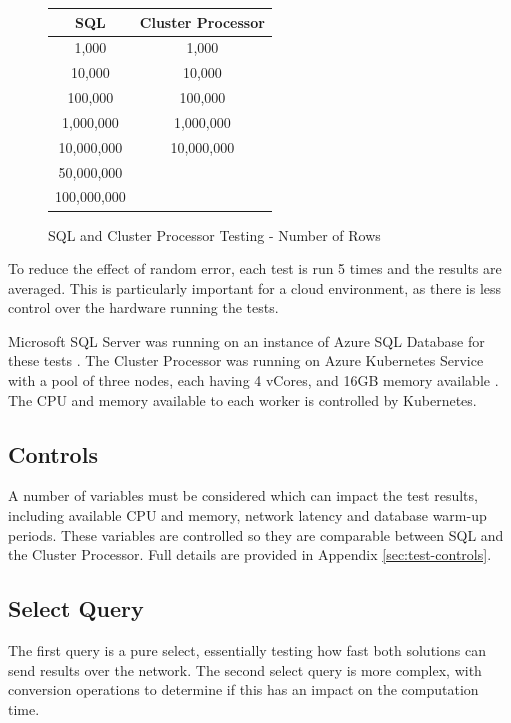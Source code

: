 \begin{figure}[ht]
	\centering
	\begin{tabular}{| c | c |}
		\hline
		\textbf{SQL} & \textbf{Cluster Processor} \\ \hline
		1,000 & 1,000 \\ \hline
		10,000 & 10,000 \\ \hline
		100,000 & 100,000 \\ \hline
		1,000,000 & 1,000,000 \\ \hline
		10,000,000 & 10,000,000 \\ \hline
		50,000,000 & \\ \hline
		100,000,000 & \\ \hline
	\end{tabular}
	\caption{SQL and Cluster Processor Testing - Number of Rows}
	\label{fig:sql-cluster-data-volumes}
\end{figure}

To reduce the effect of random error, each test is run 5 times and the results are averaged. This is particularly important for a cloud environment, as there is less control over the hardware running the tests.

Microsoft SQL Server was running on an instance of Azure SQL Database for these tests \cite{azuresqldatabase}. The Cluster Processor was running on Azure Kubernetes Service with a pool of three nodes, each having 4 vCores, and 16GB memory available \cite{azurekubernetesservice}. The CPU and memory available to each worker is controlled by Kubernetes.

\pagebreak
\subsection{Controls}
A number of variables must be considered which can impact the test results, including available CPU and memory, network latency and database warm-up periods. These variables are controlled so they are comparable between SQL and the Cluster Processor. Full details are provided in Appendix \ref{sec:test-controls}.

\subsection{Select Query}
The first query is a pure select, essentially testing how fast both solutions can send results over the network. 
The second select query is more complex, with conversion operations to determine if this has an impact on the computation time. 

